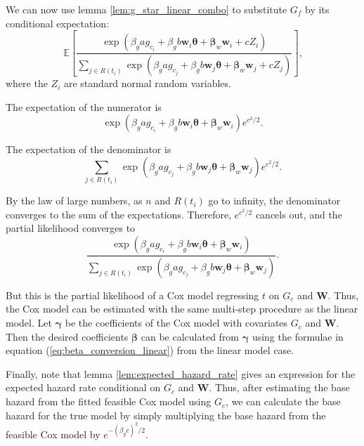 \documentclass[12pt]{article}
\begin{document}
We can now use lemma \ref{lem:g_star_linear_combo} to substitute $G_f$ by its conditional expectation:
\[
    \mathbb{E} 
    \left[
    \frac{
        \exp\left(
            \beta_g a g_{c_i} + \beta_g b \boldsymbol{w}_i \boldsymbol{\theta} + \boldsymbol{\beta}_w \boldsymbol{w}_i + c Z_i
        \right)
    }{
        \displaystyle\sum_{j \in R(t_i)}
        \exp\left(
            \beta_g a g_{c_j} + \beta_g b \boldsymbol{w}_j \boldsymbol{\theta} + \boldsymbol{\beta}_w \boldsymbol{w}_j + c Z_j
        \right)
    }
    \right]
    \text{,}
\]
where the $Z_i$ are standard normal random variables.

The expectation of the numerator is
\[
    \exp\left(
        \beta_g a g_{c_i} + \beta_g b \boldsymbol{w}_i \boldsymbol{\theta} + \boldsymbol{\beta}_w \boldsymbol{w}_i
    \right)
    e^{c^2 / 2}
    \text{.}
\]

The expectation of the denominator is
\[
    \sum_{j \in R(t_i)}
    \exp\left(
        \beta_g a g_{c_j} + \beta_g b \boldsymbol{w}_j \boldsymbol{\theta} + \boldsymbol{\beta}_w \boldsymbol{w}_j
    \right)
    e^{c^2 / 2}
    \text{.}
\]

By the law of large numbers, as $n$ and $R(t_i)$ go to infinity, the denominator converges to the sum of the expectations. Therefore, $e^{c^2 / 2}$ cancels out, and the partial likelihood converges to
\[
    \frac{
        \exp\left(
            \beta_g a g_{c_i} + \beta_g b \boldsymbol{w}_i \boldsymbol{\theta} + \boldsymbol{\beta}_w \boldsymbol{w}_i
        \right)
    }{
        \sum_{j \in R(t_i)}
        \exp\left(
            \beta_g a g_{c_j} + \beta_g b \boldsymbol{w}_j \boldsymbol{\theta} + \boldsymbol{\beta}_w \boldsymbol{w}_j
        \right)
    }
    \text{.}
\]

But this is the partial likelihood of a Cox model regressing $t$ on $G_c$ and $\boldsymbol W$. Thus, the Cox model can be estimated with the same multi-step procedure as the linear model. Let $\boldsymbol{\gamma}$ be the coefficients of the Cox model with covariates $G_c$ and $\boldsymbol W$. Then the desired coefficients $\boldsymbol{\beta}$ can be calculated from $\boldsymbol{\gamma}$ using the formulae in equation (\ref{eq:beta_conversion_linear}) from the linear model case.

Finally, note that lemma \ref{lem:expected_hazard_rate} gives an expression for the expected hazard rate conditional on $G_c$ and $\boldsymbol W$. Thus, after estimating the base hazard from the fitted feasible Cox model using $G_c$, we can calculate the base hazard for the true model by simply multiplying the base hazard from the feasible Cox model by $e^{-(\beta_g c)^2 / 2}$.
\end{document}
